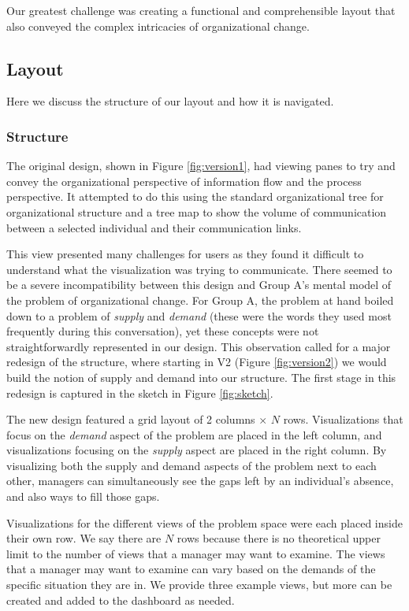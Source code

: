 \documentclass[journal]{vgtc}                %
\begin{document}
Our greatest challenge was creating a functional and comprehensible layout that also conveyed the complex intricacies of organizational change.

\subsection{Layout}
Here we discuss the structure of our layout and how it is navigated. 
\subsubsection{Structure}
The original design, shown in Figure \ref{fig:version1}, had  viewing panes to try and convey the organizational perspective of information flow and the process perspective.  It attempted to do this using the standard organizational tree for organizational structure and a tree map to show the volume of communication between a selected individual and their communication links.

This view presented many challenges for users as they found it difficult to understand what the visualization was trying to communicate. There seemed to be a severe incompatibility between this design and Group A's mental model of the problem of organizational change. For Group A, the problem at hand boiled down to a problem of \emph{supply} and \emph{demand} (these were the words they used most frequently during this conversation), yet these concepts were not straightforwardly represented in our design. This observation called for a major redesign of the structure, where starting in V2 (Figure \ref{fig:version2}) we would build the notion of supply and demand into our structure. The first stage in this redesign is captured in the sketch in Figure \ref{fig:sketch}.

The new design featured a grid layout of 2 columns $\times $ $N$ rows. Visualizations that focus on the \emph{demand} aspect of the problem are placed in the left column, and visualizations focusing on the \emph{supply} aspect are placed in the right column. By visualizing both the supply and demand aspects of the problem next to each other, managers can simultaneously see the gaps left by an individual's absence, and also ways to fill those gaps.

Visualizations for the different views of the problem space were each placed inside their own row. We say there are $N$ rows because there is no theoretical upper limit to the number of views that a manager may want to examine. The views that a manager may want to examine can vary based on the demands of the specific situation they are in. We provide three example views, but more can be created and added to the dashboard as needed.
\end{document}
